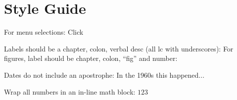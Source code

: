 \section{Style Guide}

For menu selections:
Click \textsc{}

Labels should be a chapter, colon, verbal desc (all lc with underscores): \label{03:title}
For figures, label should be chapter, colon, ``fig'' and number: \label{03:fig01}

Dates do not include an apostrophe: In the 1960s this happened...

Wrap all numbers in an in-line math block: $ 123 $

